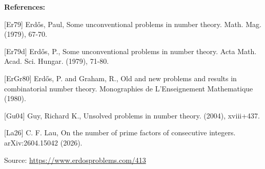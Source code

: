 \documentclass{article}
\begin{document}
\bigskip
\noindent\textbf{References:}

[Er79] Erd\H{o}s, Paul, Some unconventional problems in number theory. Math. Mag. (1979), 67-70.
 
 [Er79d] Erd\H{o}s, P., Some unconventional problems in number theory. Acta Math. Acad. Sci. Hungar. (1979), 71-80.
 
 [ErGr80] Erd\H{o}s, P. and Graham, R., Old and new problems and results in combinatorial number theory. Monographies de L'Enseignement Mathematique (1980).
 
 [Gu04] Guy, Richard K., Unsolved problems in number theory. (2004), xviii+437.
 
 [La26] C. F. Lau, On the number of prime factors of consecutive integers. arXiv:2604.15042 (2026).

\bigskip
\noindent\small{Source: \url{https://www.erdosproblems.com/413}}
\end{document}
